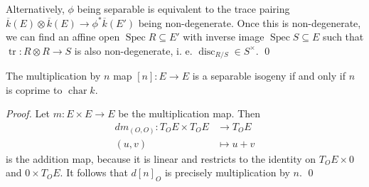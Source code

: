 Alternatively, \( \phi \) being separable is equivalent to the trace pairing \( \overline{k}(E) \otimes \overline{k}(E) \to \phi^* \overline{k}(E')  \) being non-degenerate.
Once this is non-degenerate, we can find an affine open \( \operatorname{Spec} R \subseteq E' \) with inverse image \( \operatorname{Spec} S \subseteq E \) such that \( \operatorname{tr} \colon R \otimes R \to S \) is also non-degenerate, i. e. \( \operatorname{disc}_{R/S} \in S^\times \). \qed

\begin{corollary}
  The multiplication by \( n \) map \( [n] \colon E \to E \) is a separable isogeny if and only if \( n \) is coprime to \( \operatorname{char } k \).
\end{corollary}
\textit{Proof.} Let \( m \colon E \times E \to E \)  be the multiplication map.
Then
\begin{align*}
  dm_{(O,O)} \colon T_O E \times T_O E & \to T_O E \\
  (u,v) & \mapsto u + v
\end{align*}
is the addition map, because it is linear and restricts to the identity on \( T_O E \times 0 \) and \( 0 \times T_O E \).
It follows that \( d[n]_O  \) is precisely multiplication by \( n \). \qed

